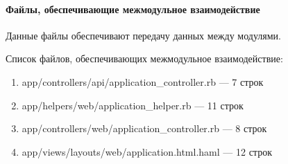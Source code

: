\paragraph{Файлы, обеспечивающие межмодульное взаимодействие}

Данные файлы обеспечивают передачу данных между модулями.

Список файлов, обеспечивающих межмодульное взаимодействие:
\begin{enumerate}[label=\arabic*)]
\item app/controllers/api/application\_controller.rb --- 7 строк
\item app/helpers/web/application\_helper.rb --- 11 строк
\item app/controllers/web/application\_controller.rb --- 8 строк
\item app/views/layouts/web/application.html.haml --- 12 строк
\end{enumerate}
